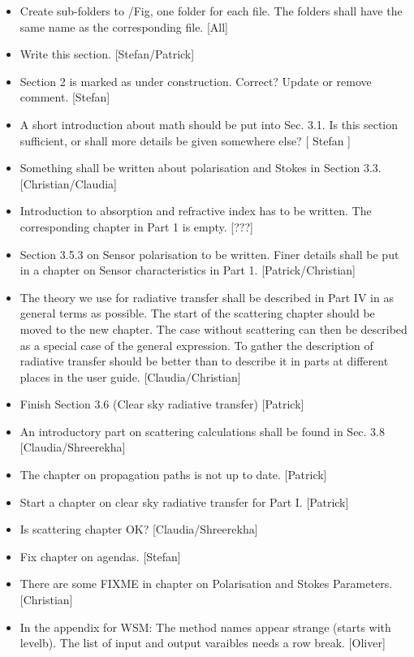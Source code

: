 \begin{itemize}
\item Create sub-folders to /Fig, one folder for each file. The folders
  shall have the same name as the corresponding file. [All]
\item Write this section. [Stefan/Patrick]
\item Section 2 is marked as under construction. Correct? Update or
  remove comment. [Stefan]
\item A short introduction about math should be put into Sec. 3.1. 
  Is this section sufficient, or shall more details be given somewhere else?
  [ Stefan ]
\item Something shall be written about polarisation and Stokes in Section
   3.3. [Christian/Claudia]
\item Introduction to absorption and refractive index has to be written.
  The corresponding chapter in Part 1 is empty.
  [???]
\item Section 3.5.3 on Sensor polarisation to be written. Finer details
  shall be put in a chapter on Sensor characteristics in Part 1. 
  [Patrick/Christian]
\item The theory we use for radiative transfer shall be described in Part
  IV in as general terms as possible. The start of the scattering chapter
  should be moved to the new chapter. The case without scattering can then
  be described as a special case of the general expression. To gather the
  description of radiative transfer should be better than to describe it 
  in parts at different places in the user guide. [Claudia/Christian]
\item Finish Section 3.6 (Clear sky radiative transfer) [Patrick]
\item An introductory part on scattering calculations shall be found
   in Sec. 3.8 [Claudia/Shreerekha]
\item The chapter on propagation paths is not up to date. [Patrick]
\item Start a chapter on clear sky radiative transfer for Part I. [Patrick]
\item Is scattering chapter OK? [Claudia/Shreerekha]
\item Fix chapter on agendas. [Stefan]
\item There are some FIXME in chapter on Polarisation and Stokes Parameters.
  [Christian]
\item In the appendix for WSM: The method names appear strange (starts
  with levelb). The list of input and output varaibles needs a row break.
  [Oliver]
\end{itemize}




